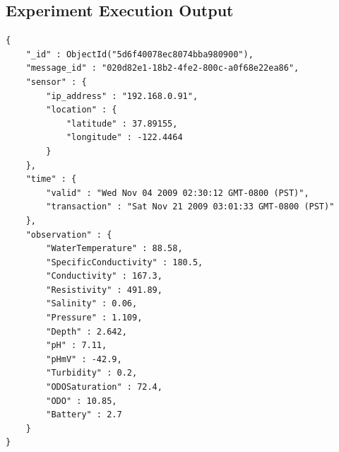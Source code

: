 















\subsection{Experiment Execution Output}

\lstset{label=file:mongodb-ysi-data-format,caption=JSON representation of the
data produced by a YSI sensor on mongoDB}
\begin{lstlisting}
{
    "_id" : ObjectId("5d6f40078ec8074bba980900"),
    "message_id" : "020d82e1-18b2-4fe2-800c-a0f68e22ea86",
    "sensor" : {
        "ip_address" : "192.168.0.91",
        "location" : {
            "latitude" : 37.89155,
            "longitude" : -122.4464
        }
    },
    "time" : {
        "valid" : "Wed Nov 04 2009 02:30:12 GMT-0800 (PST)",
        "transaction" : "Sat Nov 21 2009 03:01:33 GMT-0800 (PST)"
    },
    "observation" : {
        "WaterTemperature" : 88.58,
        "SpecificConductivity" : 180.5,
        "Conductivity" : 167.3,
        "Resistivity" : 491.89,
        "Salinity" : 0.06,
        "Pressure" : 1.109,
        "Depth" : 2.642,
        "pH" : 7.11,
        "pHmV" : -42.9,
        "Turbidity" : 0.2,
        "ODOSaturation" : 72.4,
        "ODO" : 10.85,
        "Battery" : 2.7
    }
}
\end{lstlisting}

